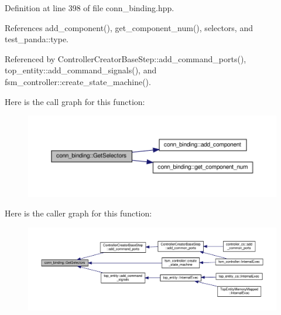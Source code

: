 Definition at line 398 of file conn\+\_\+binding.\+hpp.



References add\+\_\+component(), get\+\_\+component\+\_\+num(), selectors, and test\+\_\+panda\+::type.



Referenced by Controller\+Creator\+Base\+Step\+::add\+\_\+command\+\_\+ports(), top\+\_\+entity\+::add\+\_\+command\+\_\+signals(), and fsm\+\_\+controller\+::create\+\_\+state\+\_\+machine().

Here is the call graph for this function\+:
\nopagebreak
\begin{figure}[H]
\begin{center}
\leavevmode
\includegraphics[width=350pt]{d2/db1/classconn__binding_acc27af44bcec7ebad475db78c098ce59_cgraph}
\end{center}
\end{figure}
Here is the caller graph for this function\+:
\nopagebreak
\begin{figure}[H]
\begin{center}
\leavevmode
\includegraphics[width=350pt]{d2/db1/classconn__binding_acc27af44bcec7ebad475db78c098ce59_icgraph}
\end{center}
\end{figure}
\mbox{\label{classconn__binding_a01c01d9417e2ec21be4329bae19336ae}} 
